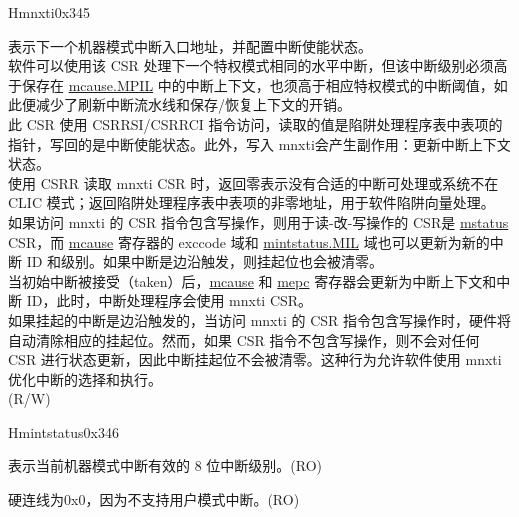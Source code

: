 \begin{register}{H}{mnxti}{0x345}\label{regdesc:MNXTI_REG}
%
\regnewline%
\begin{regdesc}\begin{reglist}
\label{fielddesc:MNXTI}\item [MNXTI]
表示下一个机器模式中断入口地址，并配置中断使能状态。\\
软件可以使用该 CSR 处理下一个特权模式相同的水平中断，但该中断级别必须高于保存在 \hyperref[fielddesc:MCAUSE_MPIL]{{mcause.MPIL}} 中的中断上下文，也须高于相应特权模式的中断阈值，如此便减少了刷新中断流水线和保存/恢复上下文的开销。\\
此 CSR 使用 CSRRSI/CSRRCI 指令访问，读取的值是陷阱处理程序表中表项的指针，写回的是中断使能状态。此外，写入 mnxti会产生副作用：更新中断上下文状态。\\
使用 CSRR 读取 mnxti CSR 时，返回零表示没有合适的中断可处理或系统不在 CLIC 模式；返回陷阱处理程序表中表项的非零地址，用于软件陷阱向量处理。\\
如果访问 mnxti 的 CSR 指令包含写操作，则用于读-改-写操作的 CSR是 \hyperref[regdesc:MSTATUS]{mstatus} CSR，而 \hyperref[regdesc:MCAUSE]{mcause} 寄存器的 exccode 域和 \hyperref[fielddesc:MINTSTATUS_MIL]{mintstatus.MIL} 域也可以更新为新的中断 ID 和级别。如果中断是边沿触发，则挂起位也会被清零。\\
当初始中断被接受（taken）后，\hyperref[regdesc:MCAUSE]{mcause} 和 \hyperref[regdesc:MEPC]{mepc} 寄存器会更新为中断上下文和中断 ID，此时，中断处理程序会使用 mnxti CSR。\\
如果挂起的中断是边沿触发的，当访问 mnxti 的 CSR 指令包含写操作时，硬件将自动清除相应的挂起位。然而，如果 CSR 指令不包含写操作，则不会对任何 CSR 进行状态更新，因此中断挂起位不会被清零。这种行为允许软件使用 mnxti 优化中断的选择和执行。\\
(R/W)
\end{reglist}\end{regdesc}
\end{register}

\begin{register}{H}{mintstatus}{0x346}
\label{regdesc:MINTSTATUS}
%
%
%
\regnewline%
\begin{regdesc}\begin{reglist}
\label{fielddesc:MINTSTATUS_MIL}\item [MIL] 表示当前机器模式中断有效的 8 位中断级别。(RO)
\label{fielddesc:MINTSTATUS_UIL}\item [UIL] 硬连线为0x0，因为不支持用户模式中断。(RO)
\end{reglist}\end{regdesc}
\end{register}


